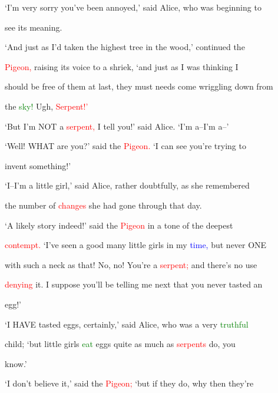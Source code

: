  ‘I’m very sorry you’ve been annoyed,’ said Alice, who was beginning to

 see its meaning.



 ‘And just as I’d taken the highest \textcolor{BurntOrange}{tree} in the wood,’ continued the

 \textcolor{red}{Pigeon,} raising its voice to a \textcolor{BurntOrange}{shriek,} ‘and just as I was thinking I

 should be free of them at last, they must needs come wriggling down from

 the \textcolor{green}{sky!} Ugh, \textcolor{red}{Serpent!’}



 ‘But I’m NOT a \textcolor{red}{serpent,} I tell you!’ said Alice. ‘I’m a--I’m a--’



 ‘Well! WHAT are you?’ said the \textcolor{red}{Pigeon.} ‘I can see you’re trying to

 invent something!’



 ‘I--I’m a little girl,’ said Alice, rather doubtfully, as she remembered

 the number of \textcolor{red}{changes} she had gone through that day.



 ‘A likely story indeed!’ said the \textcolor{red}{Pigeon} in a tone of the deepest

 \textcolor{red}{contempt.} ‘I’ve seen a \textcolor{BurntOrange}{good} many little girls in my \textcolor{blue}{time,} but never ONE

 with such a neck as that! No, no! You’re a \textcolor{red}{serpent;} and there’s no use

 \textcolor{red}{denying} it. I suppose you’ll be telling me next that you never tasted an

 egg!’



 ‘I HAVE tasted eggs, certainly,’ said Alice, who was a very \textcolor{green}{truthful}

 \textcolor{BurntOrange}{child;} ‘but little girls \textcolor{green}{eat} eggs quite as much as \textcolor{red}{serpents} do, you

 know.’



 ‘I don’t believe it,’ said the \textcolor{red}{Pigeon;} ‘but if they do, why then they’re

